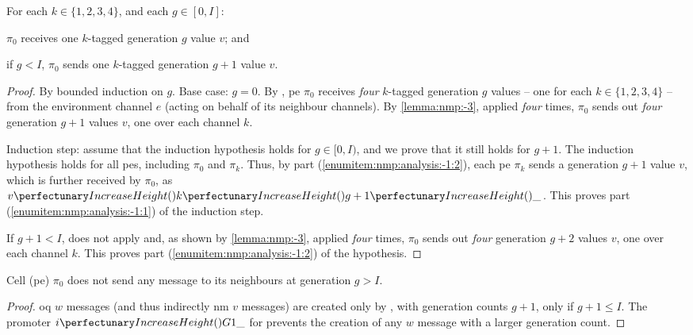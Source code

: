 \begin{theorem}\label{theorem:nmp:-1}
    For each $k \in \{ 1, 2, 3, 4 \}$, and each $g \in [0, I]$:
    \begin{inparaenum}[(i)]
        \item\label{enumitem:nmp:analysis:-1:1} $\pi_0$ receives one $k$-tagged generation $g$ value $v$; and
        \item\label{enumitem:nmp:analysis:-1:2} if $g < I$, $\pi_0$ sends one $k$-tagged generation $g+1$ value $v$.
    \end{inparaenum}
\end{theorem}

\begin{proof}
By bounded induction on $g$. Base case: $g = 0$. By , \gls{pe} $\pi_0$ receives \emph{four} $k$-tagged generation $g$ values -- one for each $k \in \{ 1, 2, 3, 4 \}$ -- from the environment channel $e$ (acting on behalf of its neighbour channels). By \cref{lemma:nmp:-3}, applied \emph{four} times, $\pi_0$ sends out \emph{four} generation $g+1$ values $v$, one over each channel $k$.

Induction step: assume that the induction hypothesis holds for 
$g \in [0, I)$, and we prove that it still holds for $g+1$.
The induction hypothesis holds for all \glspl{pe}, 
including $\pi_0$ and $\pi_k$. 
Thus, by part (\ref{enumitem:nmp:analysis:-1:2}), each \gls{pe} $\pi_k$ sends a generation $g+1$ value $v$, 
which is further received by $\pi_0$, as $\cpvv{k}{g+1}{\cpdiscard}$.
This proves part (\ref{enumitem:nmp:analysis:-1:1}) of the induction step.

If $g+1 < I$,  does not apply and, 
as shown by \cref{lemma:nmp:-3}, applied \emph{four} times, 
$\pi_0$ sends out \emph{four} generation $g+2$ values $v$, one over each channel $k$.
This proves part (\ref{enumitem:nmp:analysis:-1:2}) of the hypothesis.
\end{proof}

\begin{theorem}\label{theorem:nmp:-2}
    Cell (\gls{pe}) \(\pi_0\) does not send any message to its neighbours at generation \(g > I\).
\end{theorem}

\begin{proof}
    \Gls{oq} \(w\) messages (and thus indirectly \gls{nm} \(v\) messages) are created only by , with generation counts \(g + 1\), only if \(g + 1 \leq I\).  The \gls{promoter} \(\cpfunc{i}{G1\cpdiscard}\) for  prevents the creation of any \(w\) message with a larger generation count.
\end{proof}

